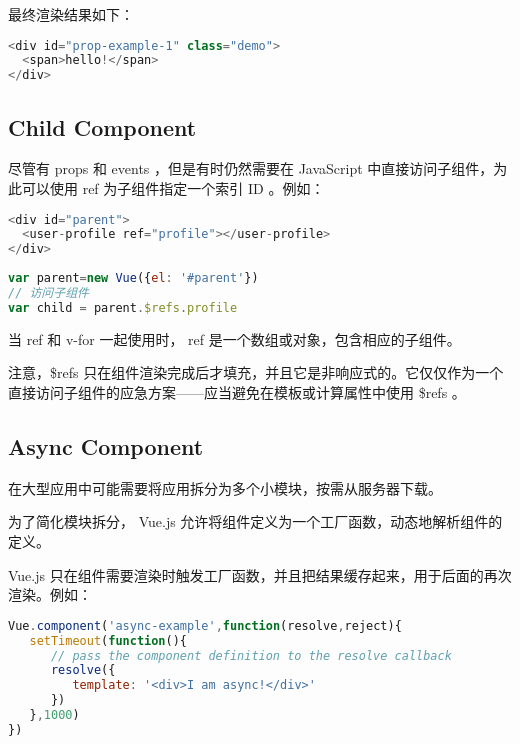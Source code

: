 最终渲染结果如下：


\begin{lstlisting}[language=JavaScript]
<div id="prop-example-1" class="demo">
  <span>hello!</span>
</div>
\end{lstlisting}


\subsection{Child Component}

尽管有 props 和 events ，但是有时仍然需要在 JavaScript 中直接访问子组件，为此可以使用 ref 为子组件指定一个索引 ID 。例如：





\begin{lstlisting}[language=JavaScript]
<div id="parent">
  <user-profile ref="profile"></user-profile>
</div>
\end{lstlisting}



\begin{lstlisting}[language=JavaScript]
var parent=new Vue({el: '#parent'})
// 访问子组件
var child = parent.$refs.profile
\end{lstlisting}

当 ref 和 v-for 一起使用时， ref 是一个数组或对象，包含相应的子组件。

注意，\$refs 只在组件渲染完成后才填充，并且它是非响应式的。它仅仅作为一个直接访问子组件的应急方案——应当避免在模板或计算属性中使用 \$refs 。


\subsection{Async Component}


在大型应用中可能需要将应用拆分为多个小模块，按需从服务器下载。

为了简化模块拆分， Vue.js 允许将组件定义为一个工厂函数，动态地解析组件的定义。

Vue.js 只在组件需要渲染时触发工厂函数，并且把结果缓存起来，用于后面的再次渲染。例如：

\begin{lstlisting}[language=JavaScript]
Vue.component('async-example',function(resolve,reject){
   setTimeout(function(){
      // pass the component definition to the resolve callback
      resolve({
         template: '<div>I am async!</div>'
      })
   },1000)
})
\end{lstlisting}

